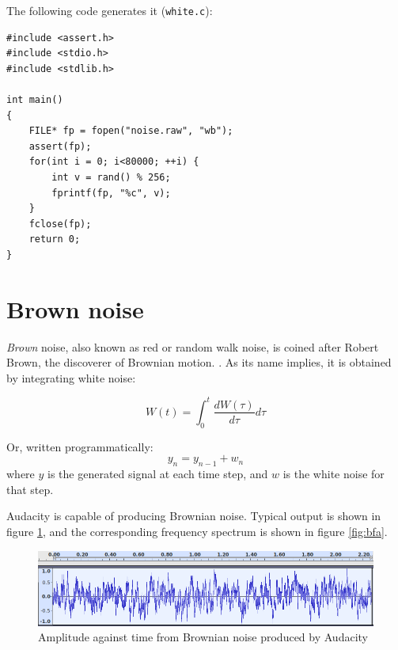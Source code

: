 \documentclass[a4paper,10pt]{article}
\def\code#1{\texttt{#1}}
\begin{document}
The following code generates it (\code{white.c}):
\begin{Verbatim}[tabsize=8]
#include <assert.h>
#include <stdio.h>
#include <stdlib.h>

int main()
{
	FILE* fp = fopen("noise.raw", "wb");
	assert(fp);
	for(int i = 0; i<80000; ++i) {
		int v = rand() % 256;
		fprintf(fp, "%c", v);
	}
	fclose(fp);
	return 0;
}
\end{Verbatim}
%

%
 
\section{Brown noise}

\emph{Brown} noise, also known as red or random walk noise, is coined after Robert Brown, the discoverer of Brownian 
motion. \cite{brown}. 
As its name implies, it is obtained by integrating white noise:

\begin{equation}
 W(t) = \int_{0}^{t} \frac{dW(\tau)}{d\tau} d\tau
\end{equation}

Or, written programmatically:
\begin{equation} 
	\label{eq:browneq}
	y_{n} = y_{n-1} + w_n
\end{equation}
where $y$ is the generated signal at each time step, and $w$ is the white noise for that step.

Audacity \cite{audacity} is capable of producing Brownian noise. Typical output is shown in figure \ref{fig:baa}, and the corresponding frequency spectrum is shown in figure \ref{fig:bfa}.

\begin{figure}[h]
	\centering
	\includegraphics[width=12cm]{brown-amp-audacity.png}
	\caption{Amplitude against time from Brownian noise produced by Audacity}
	\label{fig:baa}
\end{figure}
\end{document}
